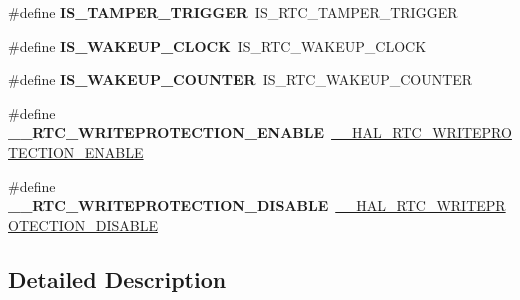 \begin{DoxyCompactItemize}
\item 
\#define {\bfseries I\+S\+\_\+\+T\+A\+M\+P\+E\+R\+\_\+\+T\+R\+I\+G\+G\+ER}~I\+S\+\_\+\+R\+T\+C\+\_\+\+T\+A\+M\+P\+E\+R\+\_\+\+T\+R\+I\+G\+G\+ER\hypertarget{group___h_a_l___r_t_c___aliased___macros_gaa0fe0373701cfd583ae46173a60248b2}{}\label{group___h_a_l___r_t_c___aliased___macros_gaa0fe0373701cfd583ae46173a60248b2}

\item 
\#define {\bfseries I\+S\+\_\+\+W\+A\+K\+E\+U\+P\+\_\+\+C\+L\+O\+CK}~I\+S\+\_\+\+R\+T\+C\+\_\+\+W\+A\+K\+E\+U\+P\+\_\+\+C\+L\+O\+CK\hypertarget{group___h_a_l___r_t_c___aliased___macros_ga85becc3221346e2b872ca8f205776a47}{}\label{group___h_a_l___r_t_c___aliased___macros_ga85becc3221346e2b872ca8f205776a47}

\item 
\#define {\bfseries I\+S\+\_\+\+W\+A\+K\+E\+U\+P\+\_\+\+C\+O\+U\+N\+T\+ER}~I\+S\+\_\+\+R\+T\+C\+\_\+\+W\+A\+K\+E\+U\+P\+\_\+\+C\+O\+U\+N\+T\+ER\hypertarget{group___h_a_l___r_t_c___aliased___macros_ga806f88006a410ad9a990d4b1dff449f4}{}\label{group___h_a_l___r_t_c___aliased___macros_ga806f88006a410ad9a990d4b1dff449f4}

\item 
\#define {\bfseries \+\_\+\+\_\+\+R\+T\+C\+\_\+\+W\+R\+I\+T\+E\+P\+R\+O\+T\+E\+C\+T\+I\+O\+N\+\_\+\+E\+N\+A\+B\+LE}~\hyperlink{group___r_t_c___exported___macros_ga9eaed4a4db3b3232c1ca5d8ffa6ff4d8}{\+\_\+\+\_\+\+H\+A\+L\+\_\+\+R\+T\+C\+\_\+\+W\+R\+I\+T\+E\+P\+R\+O\+T\+E\+C\+T\+I\+O\+N\+\_\+\+E\+N\+A\+B\+LE}\hypertarget{group___h_a_l___r_t_c___aliased___macros_gad93d3e4b8add5593e8a4c0ee4b60c659}{}\label{group___h_a_l___r_t_c___aliased___macros_gad93d3e4b8add5593e8a4c0ee4b60c659}

\item 
\#define {\bfseries \+\_\+\+\_\+\+R\+T\+C\+\_\+\+W\+R\+I\+T\+E\+P\+R\+O\+T\+E\+C\+T\+I\+O\+N\+\_\+\+D\+I\+S\+A\+B\+LE}~\hyperlink{group___r_t_c___exported___macros_gae150645fb78c1d175b9e0f88fc3f4ad4}{\+\_\+\+\_\+\+H\+A\+L\+\_\+\+R\+T\+C\+\_\+\+W\+R\+I\+T\+E\+P\+R\+O\+T\+E\+C\+T\+I\+O\+N\+\_\+\+D\+I\+S\+A\+B\+LE}\hypertarget{group___h_a_l___r_t_c___aliased___macros_ga50e1d57530318f33dfa59d44c3f086ce}{}\label{group___h_a_l___r_t_c___aliased___macros_ga50e1d57530318f33dfa59d44c3f086ce}

\end{DoxyCompactItemize}


\subsection{Detailed Description}


